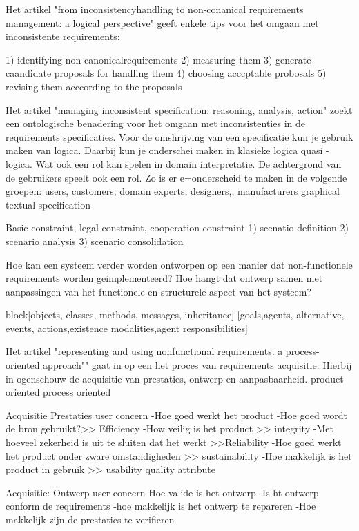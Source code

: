  
 Het artikel "from inconsistencyhandling to non-conanical requirements management: a logical perspective" geeft enkele tips voor het omgaan met inconsistente requirements:
 
 1) identifying non-canonicalrequirements
 2) measuring them
 3) generate caandidate proposals for handling them
 4) choosing acccptable probosals
 5) revising them acccording to the proposals

Het artikel "managing inconsistent specification: reasoning, analysis, action" zoekt een ontologische benadering voor het omgaan met inconsistenties in de requirements specificaties.
Voor de omshrijving van een specificatie kun je gebruik maken van logica. Daarbij kun je onderschei maken in klasieke logica quasi -logica.
Wat ook een rol kan spelen in domain interpretatie. De achtergrond van de gebruikers speelt ook een rol.
Zo is er e=onderscheid te maken in de volgende groepen: users, customers, domain experts, designers,, manufacturers
graphical  textual specification

Basic constraint, legal constraint, cooperation constraint
1) scenatio  definition
2) scenario analysis
3) scenario consolidation


Hoe kan een systeem verder worden ontworpen op een manier dat non-functionele requirements worden geimplementeerd?
Hoe hangt dat ontwerp samen met aanpassingen van het functionele en structurele aspect van het systeem?

block[objects, classes, methods, messages, inheritance]
[goals,agents, alternative, events, actions,existence modalities,agent responsibilities]


Het artikel "representing and using nonfunctional requirements: a process-oriented approach"" gaat in op een het proces van requirements acquisitie. Hierbij in ogenschouw de acquisitie van prestaties, ontwerp en aanpasbaarheid.
product oriented
process oriented


Acquisitie Prestaties
user concern
-Hoe goed werkt het product
-Hoe goed wordt de bron gebruikt?>> Efficiency
-How veilig is het product >> integrity
-Met hoeveel zekerheid is uit  te sluiten dat het werkt >>Reliability
-Hoe goed werkt het product onder zware omstandigheden >> sustainability
-Hoe makkelijk is het product in gebruik >> usability
quality attribute


Acquisitie: Ontwerp
user concern
Hoe valide is het ontwerp
-Is ht ontwerp conform de requirements
-hoe makkelijk is het ontwerp te repareren
-Hoe makkelijk zijn de prestaties te verifieren

